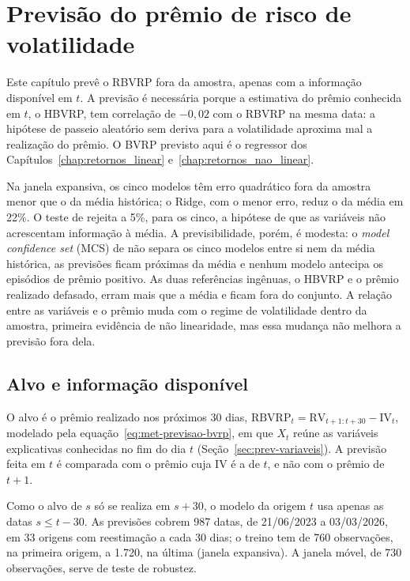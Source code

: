 \chapter{Previsão do prêmio de risco de volatilidade}
\label{chap:previsao_bvrp}

Este capítulo prevê o RBVRP fora da amostra, apenas com a informação disponível
em $t$. A previsão é necessária porque a estimativa do prêmio conhecida em $t$,
o HBVRP, tem correlação de $-0{,}02$ com o RBVRP na mesma
data: a hipótese de passeio aleatório sem
deriva para a volatilidade aproxima mal a realização do prêmio. O
BVRP previsto aqui é o regressor dos Capítulos~\ref{chap:retornos_linear}
e~\ref{chap:retornos_nao_linear}.

Na janela expansiva, os cinco modelos têm erro quadrático fora da amostra
menor que o da média histórica; o Ridge, com o menor erro, reduz o da média em
22\%. O teste de \citet{clark2007approximately} rejeita a 5\%, para os cinco, a
hipótese de que as variáveis não acrescentam informação à média. A
previsibilidade, porém, é modesta: o \textit{model confidence set} (MCS) de
\citet{hansen2011model} não separa os cinco modelos entre si nem da média
histórica, as previsões ficam próximas da média e nenhum modelo antecipa os
episódios de prêmio positivo. As duas referências ingênuas, o HBVRP e o prêmio
realizado defasado, erram mais que a média e ficam fora do conjunto. A relação entre as variáveis e o prêmio muda com o regime de
volatilidade dentro da amostra, primeira evidência de não linearidade, mas
essa mudança não melhora a previsão fora dela.

\section{Alvo e informação disponível}
\label{sec:prev-alvo}

O alvo é o prêmio realizado nos próximos 30 dias,
$\text{RBVRP}_t = \text{RV}_{t+1:t+30} - \text{IV}_t$, modelado pela
equação~\eqref{eq:met-previsao-bvrp}, em que $X_t$ reúne as variáveis
explicativas conhecidas no fim do dia $t$ (Seção~\ref{sec:prev-variaveis}). A
previsão feita em $t$ é comparada com o prêmio cuja IV é a de $t$, e não com o
prêmio de $t+1$.

Como o alvo de $s$ só se realiza em $s+30$, o modelo da origem $t$ usa apenas
as datas $s \le t - 30$. As previsões cobrem 987 datas, de 21/06/2023 a
03/03/2026, em 33 origens com reestimação a cada 30 dias; o treino tem de 760
observações, na primeira origem, a 1.720, na última (janela expansiva). A
janela móvel, de 730 observações, serve de teste de robustez.

